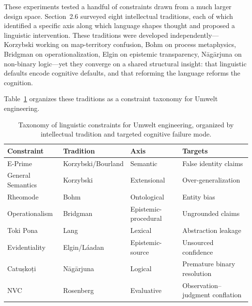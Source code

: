 \documentclass[11pt,a4paper]{article}
\begin{document}
These experiments tested a handful of constraints drawn from a much larger design space. Section~2.6 surveyed eight intellectual traditions, each of which identified a specific axis along which language shapes thought and proposed a linguistic intervention. These traditions were developed independently---Korzybski working on map-territory confusion, Bohm on process metaphysics, Bridgman on operationalization, Elgin on epistemic transparency, N\={a}g\={a}rjuna on non-binary logic---yet they converge on a shared structural insight: that linguistic defaults encode cognitive defaults, and that reforming the language reforms the cognition.

Table~\ref{tab:taxonomy} organizes these traditions as a constraint taxonomy for Umwelt engineering.

\begin{table}[t]
\centering
\caption{Taxonomy of linguistic constraints for Umwelt engineering, organized by intellectual tradition and targeted cognitive failure mode.}
\label{tab:taxonomy}
\smallskip
\begin{tabular}{@{}llll@{}}
\toprule
Constraint & Tradition & Axis & Targets \\
\midrule
E-Prime              & Korzybski/Bourland & Semantic            & False identity claims \\
General Semantics    & Korzybski          & Extensional         & Over-generalization \\
Rheomode             & Bohm               & Ontological         & Entity bias \\
Operationalism       & Bridgman           & Epistemic-procedural & Ungrounded claims \\
Toki Pona            & Lang               & Lexical             & Abstraction leakage \\
Evidentiality        & Elgin/L\'{a}adan   & Epistemic-source    & Unsourced confidence \\
Catu\d{s}ko\d{t}i   & N\={a}g\={a}rjuna  & Logical             & Premature binary resolution \\
NVC                  & Rosenberg          & Evaluative          & Observation--judgment conflation \\
\bottomrule
\end{tabular}
\end{table}
\end{document}

